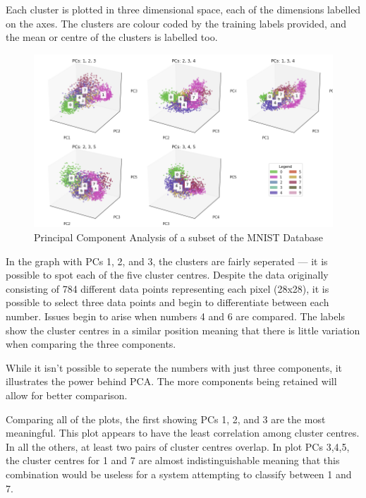 \documentclass[11pt,journal,transmag,final]{IEEEtran}
\begin{document}
Each cluster is plotted in three dimensional space, each of the dimensions labelled on the axes. The clusters are colour coded by the training labels provided, and the mean or centre of the clusters is labelled too.

\begin{figure}[!t]
    \begin{center}
        \includegraphics[width=\textwidth,keepaspectratio]{figures/pca-results.png}
        \caption{Principal Component Analysis of a subset of the MNIST Database}
        \label{fig:pca-results}
    \end{center}
\end{figure}

In the graph with PCs 1, 2, and 3, the clusters are fairly seperated --- it is possible to spot each of the five cluster centres. Despite the data originally consisting of 784 different data points representing each pixel (28x28), it is possible to select three data points and begin to differentiate between each number. Issues begin to arise when numbers 4 and 6 are compared. The labels show the cluster centres in a similar position meaning that there is little variation when comparing the three components.

While it isn't possible to seperate the numbers with just three components, it illustrates the power behind PCA. The more components being retained will allow for better comparison.

Comparing all of the plots, the first showing PCs 1, 2, and 3 are the most meaningful. This plot appears to have the least correlation among cluster centres. In all the others, at least two pairs of cluster centres overlap. In plot PCs 3,4,5, the cluster centres for 1 and 7 are almost indistinguishable meaning that this combination would be useless for a system attempting to classify between 1 and 7.
\end{document}
